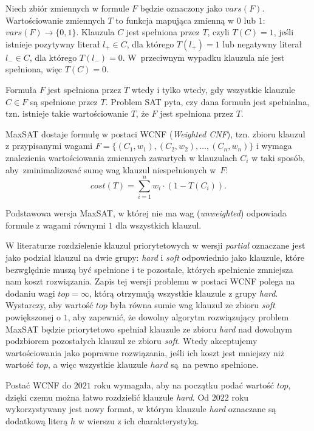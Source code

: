 \documentclass[shortabstract]{iithesis}
\begin{document}
Niech zbiór zmiennych w formule $F$ będzie oznaczony jako $vars(F)$.
Wartościowanie zmiennych $T$ to funkcja mapująca zmienną w $0$ lub $1$:
$vars(F) \rightarrow \{0, 1\}$. Klauzula $C$ jest spełniona przez $T$, czyli $T(C) = 1$, jeśli istnieje pozytywny literał $l_+ \in C$, dla którego $T(l_+) = 1$ lub negatywny literał $l_- \in C$, dla którego $T(l_-) = 0$. W~przeciwnym wypadku klauzula nie jest spełniona, więc $T(C) = 0$.

Formuła $F$ jest spełniona przez $T$ wtedy i tylko wtedy, gdy wszystkie klauzule $C \in F$ są spełnione przez $T$. Problem SAT pyta, czy dana formuła jest spełnialna, tzn. istnieje takie wartościowanie $T$, że $F$ jest spełniona przez $T$.

MaxSAT dostaje formułę w postaci WCNF (\textit{Weighted CNF}), tzn. zbioru klauzul z przypisanymi wagami $F = \{(C_1, w_1), (C_2, w_2), \dots, (C_n, w_n)\}$ i wymaga znalezienia wartościowania zmiennych zawartych w klauzulach $C_i$ w taki sposób, aby~zminimalizować sumę wag klauzul niespełnionych w~$F$:
$$cost(T) = \sum_{i = 1}^n w_i\cdot(1 - T(C_i)).$$

Podstawowa wersja MaxSAT, w której nie ma wag (\textit{unweighted}) odpowiada formule z wagami równymi $1$ dla wszystkich klauzul.

W literaturze rozdzielenie klauzul priorytetowych w wersji \textit{partial} oznaczane jest jako podział klauzul na dwie grupy: \textit{hard} i \textit{soft} odpowiednio jako klauzule, które bezwględnie muszą być spełnione i te pozostałe, których spełnienie zmniejsza nam koszt rozwiązania. Zapis tej wersji problemu w postaci WCNF polega na dodaniu wagi $top = \infty$, którą otrzymują wszystkie klauzule z grupy \textit{hard}. \\
Wystarczy, aby wartość $top$ była równa sumie wag klauzul ze zbioru \textit{soft} powiększonej o $1$, aby 
zapewnić, że dowolny algorytm rozwiązujący problem MaxSAT będzie priorytetowo spełniał klauzule ze zbioru \textit{hard} nad dowolnym podzbiorem pozostałych klauzul ze zbioru \textit{soft}. Wtedy akceptujemy wartościowania jako poprawne rozwiązania, jeśli ich koszt jest mniejszy niż wartość $top$, a więc wszystkie klauzule $hard$ są~na pewno spełnione.

Postać WCNF do $2021$ roku wymagała, aby na początku podać wartość $top$, dzięki czemu można łatwo rozdzielić klauzule \textit{hard}. Od $2022$ roku wykorzystywany jest nowy format, w którym klauzule \textit{hard} oznaczane są dodatkową literą $h$ w wierszu z ich charakterystyką.
\end{document}
